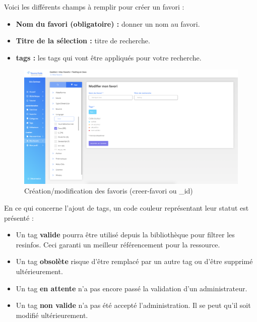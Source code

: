 
Voici les différents champs à remplir pour créer un favori :

\begin{itemize}
    \item \textbf{Nom du favori (obligatoire) :} donner un nom au favori.
    \item \textbf{Titre de la sélection :} titre de recherche.
    \item \textbf{\Glspl{tag} :} les tags qui vont être appliqués pour votre recherche.
\end{itemize}

\begin{figure}[H]
    \includegraphics[width=\textwidth,height=\textheight,keepaspectratio]{images/client/favorite-form.png}
    \caption[SourceCode : création/modification des favoris]{Création/modification des favoris (creer-favori ou \_id)}
    \centering
\end{figure}

En ce qui concerne l'ajout de \glspl{tag}, un code couleur représentant leur statut est présenté :

\begin{itemize}
    \item Un \gls{tag} \textbf{valide} pourra être utilisé depuis la bibliothèque pour filtrer les \glspl{resinfo}. Ceci garanti un meilleur référencement pour la ressource.
    \item Un \gls{tag} \textbf{obsolète} risque d'être remplacé par un autre \gls{tag} ou d'être supprimé ultérieurement.
    \item Un \gls{tag} \textbf{en attente} n'a pas encore passé la validation d'un administrateur.
    \item Un \gls{tag} \textbf{non valide} n'a pas été accepté l'administration. Il se peut qu'il soit modifié ultérieurement.
\end{itemize}

